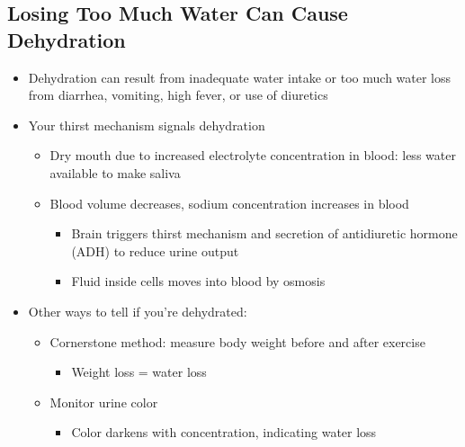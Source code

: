 \documentclass[12pt]{article}
\begin{document}
        \subsection{Losing Too Much Water Can Cause Dehydration}
            \begin{itemize}
                \item Dehydration can result from inadequate water intake or too much water loss from diarrhea, vomiting, high fever, or use of diuretics
                \item Your thirst mechanism signals dehydration
                    \begin{itemize}
                        \item Dry mouth due to increased electrolyte concentration in blood: less water available to make saliva
                        \item Blood volume decreases, sodium concentration increases in blood
                            \begin{itemize}
                                \item Brain triggers thirst mechanism and secretion of antidiuretic hormone (ADH) to reduce urine output
                                \item Fluid inside cells moves into blood by osmosis
                            \end{itemize}
                    \end{itemize}
                \item Other ways to tell if you're dehydrated:
                    \begin{itemize}
                        \item Cornerstone method: measure body weight before and after exercise
                            \begin{itemize}
                                \item Weight loss = water loss
                            \end{itemize}
                        \item Monitor urine color
                            \begin{itemize}
                                \item Color darkens with concentration, indicating water loss
                            \end{itemize}
                    \end{itemize}
            \end{itemize}
            
\end{document}
